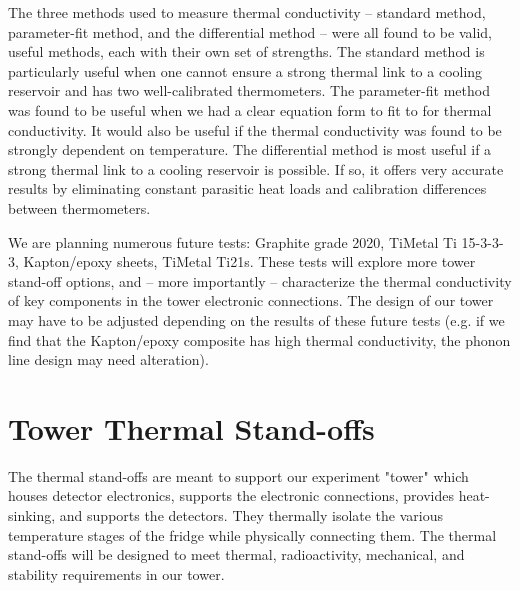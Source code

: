 \documentclass{report}
\begin{document}
The three methods used to measure thermal conductivity -- standard method, parameter-fit method, and the differential method -- were all found to be valid, useful methods, each with their own set of strengths. The standard method is particularly useful when one cannot ensure a strong thermal link to a cooling reservoir and has two well-calibrated thermometers. The parameter-fit method was found to be useful when we had a clear equation form to fit to for thermal conductivity. It would also be useful if the thermal conductivity was found to be strongly dependent on temperature. The differential method is most useful if a strong thermal link to a cooling reservoir is possible. If so, it offers very accurate results by eliminating constant parasitic heat loads and calibration differences between thermometers.

We are planning numerous future tests: Graphite grade 2020, TiMetal Ti 15-3-3-3, Kapton/epoxy sheets, TiMetal Ti21s. These tests will explore more tower stand-off options, and -- more importantly -- characterize the thermal conductivity of key components in the tower electronic connections. The design of our tower may have to be adjusted depending on the results of these future tests (e.g. if we find that the Kapton/epoxy composite has high thermal conductivity, the phonon line design may need alteration).

\section{Tower Thermal Stand-offs}

The thermal stand-offs are meant to support our experiment "tower" which houses detector electronics, supports the electronic connections, provides heat-sinking, and supports the detectors. They thermally isolate the various temperature stages of the fridge while physically connecting them. The thermal stand-offs will be designed to meet thermal, radioactivity, mechanical, and stability requirements in our tower.
\end{document}
